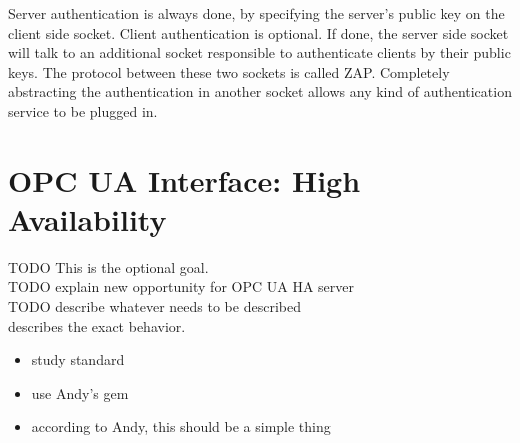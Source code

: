 Server authentication is always done, by specifying the server's public key on
the client side socket.  Client authentication is optional. If done, the server
side socket will talk to an additional socket responsible to authenticate
clients by their public keys. The protocol between these two sockets is called
\gls{ZAP}. Completely abstracting the authentication in another socket allows
any kind of authentication service to be plugged in.



\section{OPC UA Interface: High Availability}\label{sec:meth:opc-ua}
TODO This is the optional goal.\\
TODO explain new opportunity for OPC UA HA server\\
TODO describe whatever needs to be described\\


\cite[6.4.2.4 Non-transparent Redundancy, p.~96]{opc-ua:behavior:server-redundancy} describes the exact behavior.

\begin{itemize}
	\item study standard
	\item use Andy's gem
	\item according to Andy, this should be a simple thing
\end{itemize}
